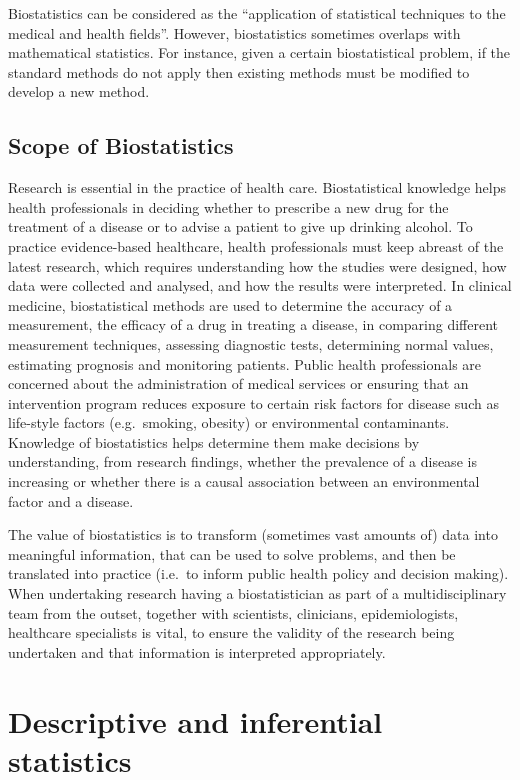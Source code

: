 \documentclass[
  a4paper,
]{memoir}
\begin{document}
Biostatistics can be considered as the ``application of statistical
techniques to the medical and health fields''. However, biostatistics
sometimes overlaps with mathematical statistics. For instance, given a
certain biostatistical problem, if the standard methods do not apply
then existing methods must be modified to develop a new method.

\hypertarget{scope-of-biostatistics}{%
\subsection{Scope of Biostatistics}\label{scope-of-biostatistics}}

Research is essential in the practice of health care. Biostatistical
knowledge helps health professionals in deciding whether to prescribe a
new drug for the treatment of a disease or to advise a patient to give
up drinking alcohol. To practice evidence-based healthcare, health
professionals must keep abreast of the latest research, which requires
understanding how the studies were designed, how data were collected and
analysed, and how the results were interpreted. In clinical medicine,
biostatistical methods are used to determine the accuracy of a
measurement, the efficacy of a drug in treating a disease, in comparing
different measurement techniques, assessing diagnostic tests,
determining normal values, estimating prognosis and monitoring patients.
Public health professionals are concerned about the administration of
medical services or ensuring that an intervention program reduces
exposure to certain risk factors for disease such as life-style factors
(e.g.~smoking, obesity) or environmental contaminants. Knowledge of
biostatistics helps determine them make decisions by understanding, from
research findings, whether the prevalence of a disease is increasing or
whether there is a causal association between an environmental factor
and a disease.

The value of biostatistics is to transform (sometimes vast amounts of)
data into meaningful information, that can be used to solve problems,
and then be translated into practice (i.e.~to inform public health
policy and decision making). When undertaking research having a
biostatistician as part of a multidisciplinary team from the outset,
together with scientists, clinicians, epidemiologists, healthcare
specialists is vital, to ensure the validity of the research being
undertaken and that information is interpreted appropriately.

\hypertarget{descriptive-and-inferential-statistics}{%
\section{Descriptive and inferential
statistics}\label{descriptive-and-inferential-statistics}}
\end{document}
